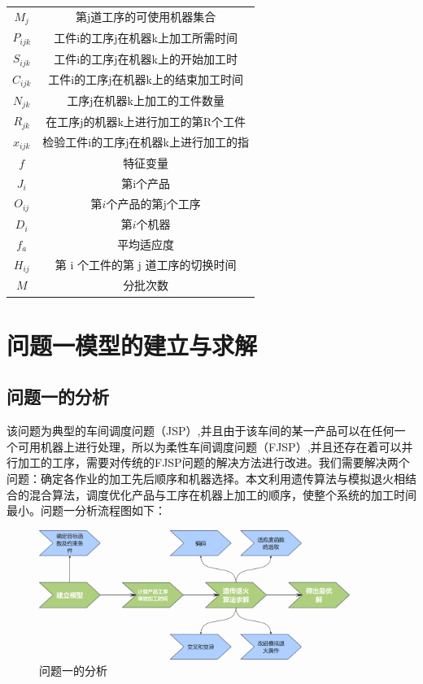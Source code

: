 \documentclass{whutmod}
\begin{document}
\begin{spacing}{1.2}
\begin{center}
\begin{tabular}{cc}
     $M_{j}$         & 第j道工序的可使用机器集合\\
     $P_{ijk}$        & 工件i的工序j在机器k上加工所需时间\\
     $S_{ijk}$          &  工件i的工序j在机器k上的开始加工时\\
     $C_{ijk}$        & 工件i的工序j在机器k上的结束加工时间\\
     $N_{jk}$         &工序j在机器k上加工的工件数量\\
     $R_{jk}$         &在工序j的机器k上进行加工的第R个工件\\
     $x_{ijk}$         &检验工件i的工序j在机器k上进行加工的指\\
     $f$         &特征变量\\
     $J_i$        &第i个产品\\
     $O_{ij}$        &第$i$个产品的第j个工序\\
     $D_i$   &第$i$个机器\\
     $f_a$   &平均适应度\\
     $H_{ij}$     &第 i 个工件的第 j 道工序的切换时间\\
     $M$  &分批次数\\
      
      
     
     
     
    \bottomrule[1.5pt]
    \end{tabular}
    \end{center}

	\clearpage

    
    
	
	\section{问题一模型的建立与求解}

	\subsection{问题一的分析}
	该问题为典型的车间调度问题（JSP）\cite{2},并且由于该车间的某一产品可以在任何一个可用机器上进行处理，所以为柔性车间调度问题（FJSP）,并且还存在着可以并行加工的工序，需要对传统的FJSP问题的解决方法进行改进。我们需要解决两个问题：确定各作业的加工先后顺序和机器选择。本文利用遗传算法与模拟退火相结合的混合算法，调度优化产品与工序在机器上加工的顺序，使整个系统的加工时间最小。问题一分析流程图如下：
	\begin{figure}[H]
        \centering
        \includegraphics[width=0.9\textwidth]{模型一流程图.jpg}
        \caption{问题一的分析}
    \end{figure}


\end{spacing}
\end{document}
